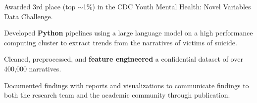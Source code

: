\begin{bullets}
	\item Awarded 3rd place (top $\sim$1\%) in the CDC Youth Mental Health: Novel Variables Data Challenge.
	\item Developed \textbf{Python} pipelines using a large language model on a high performance computing cluster to extract trends from the narratives of victims of suicide.
	\item Cleaned, preprocessed, and \textbf{feature engineered} a confidential dataset of over 400,000 narratives.
	\item Documented findings with reports and visualizations to communicate findings to both the research team and the academic community through publication.
\end{bullets}